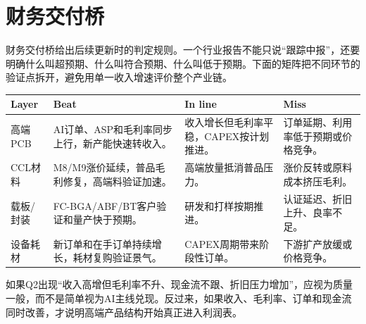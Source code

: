 \section{财务交付桥}

财务交付桥给出后续更新时的判定规则。一个行业报告不能只说“跟踪中报”，还要明确什么叫超预期、什么叫符合预期、什么叫低于预期。下面的矩阵把不同环节的验证点拆开，避免用单一收入增速评价整个产业链。

\begin{exhibitbox}[图表6-16：从已披露交付到下一验证点]
\small
\begin{tabularx}{\textwidth}{L{2.6cm}X X X}
\toprule
\textbf{Layer} & \textbf{Beat} & \textbf{In line} & \textbf{Miss} \\
\midrule
高端PCB & AI订单、ASP和毛利率同步上行，新产能快速转收入。 & 收入增长但毛利率平稳，CAPEX按计划推进。 & 订单延期、利用率低于预期或价格竞争。 \\
CCL材料 & M8/M9涨价延续，普品毛利修复，高端料验证加速。 & 高端放量抵消普品压力。 & 涨价反转或原料成本挤压毛利。 \\
载板/封装 & FC-BGA/ABF/BT客户验证和量产快于预期。 & 研发和打样按期推进。 & 认证延迟、折旧上升、良率不足。 \\
设备耗材 & 新订单和在手订单持续增长，耗材复购验证景气。 & CAPEX周期带来阶段性订单。 & 下游扩产放缓或价格竞争。 \\
\bottomrule
\end{tabularx}
\end{exhibitbox}

如果Q2出现“收入高增但毛利率不升、现金流不跟、折旧压力增加”，应视为质量一般，而不是简单视为AI主线兑现。反过来，如果收入、毛利率、订单和现金流同时改善，才说明高端产品结构开始真正进入利润表。

